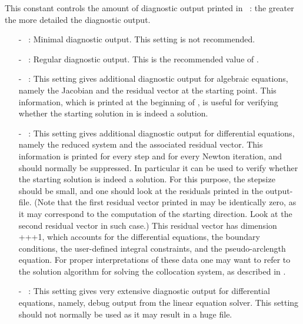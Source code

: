  This constant controls the amount of diagnostic output printed in ~:
 the greater  the more detailed the diagnostic output.
\begin{itemize}
\item[-] ~:  
  Minimal diagnostic output. This setting is not recommended.
\item[-] ~: 
  Regular diagnostic output. This is the recommended value of .
\item[-] ~: 
  This setting gives additional diagnostic output for algebraic equations,
  namely the Jacobian and the residual vector at the starting point.
  This information, which is printed at the beginning of ,
  is useful for verifying whether the starting solution in  is indeed 
  a solution.
\item[-] ~: 
  This setting gives additional diagnostic output for differential equations,
  namely the reduced system and the associated residual vector. 
  This information is printed for every step and for every Newton iteration,
  and should normally be suppressed.
  In particular it can be used to verify whether the starting solution
  is indeed a solution. For this purpose, the stepsize  should
  be small, and one should look at the residuals printed in the 
  output-file. (Note that the first residual vector printed in  may
  be identically zero, as it may correspond to the computation of the starting
  direction. Look at the second residual vector in such case.)
  This residual vector has dimension 
  +++1, which accounts for the 
  differential equations, the  boundary conditions, the  user-defined
  integral constraints, and the pseudo-arclength equation.
  For proper interpretations of these data one may want to refer to the solution
  algorithm for solving the collocation system, as described in
   \citeyear{DoKeKe:91b}.
\item[-] ~:
  This setting gives very extensive diagnostic output for differential equations,
  namely, debug output from the linear equation solver.
  This setting should not normally be used as it may result
  in a huge  file. 
\end{itemize}

\subsection{}  \label{sec:IPLT}

